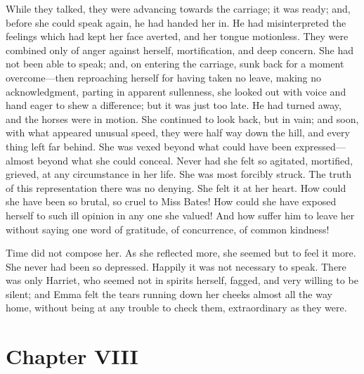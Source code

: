 While they talked, they were advancing towards the carriage;
it was ready; and, before she could speak again, he had handed her in.
He had misinterpreted the feelings which had kept her face averted,
and her tongue motionless.  They were combined only of anger
against herself, mortification, and deep concern.  She had not
been able to speak; and, on entering the carriage, sunk back
for a moment overcome---then reproaching herself for having taken
no leave, making no acknowledgment, parting in apparent sullenness,
she looked out with voice and hand eager to shew a difference;
but it was just too late.  He had turned away, and the horses were
in motion.  She continued to look back, but in vain; and soon,
with what appeared unusual speed, they were half way down the hill,
and every thing left far behind.  She was vexed beyond what could
have been expressed---almost beyond what she could conceal.
Never had she felt so agitated, mortified, grieved, at any circumstance
in her life.  She was most forcibly struck.  The truth of this
representation there was no denying.  She felt it at her heart.
How could she have been so brutal, so cruel to Miss Bates!  How could
she have exposed herself to such ill opinion in any one she valued!
And how suffer him to leave her without saying one word of gratitude,
of concurrence, of common kindness!

Time did not compose her.  As she reflected more, she seemed
but to feel it more.  She never had been so depressed.  Happily it
was not necessary to speak.  There was only Harriet, who seemed not
in spirits herself, fagged, and very willing to be silent; and Emma
felt the tears running down her cheeks almost all the way home,
without being at any trouble to check them, extraordinary as they were.



\chapter{Chapter VIII}


